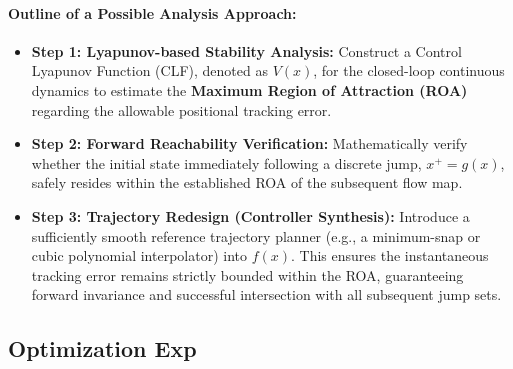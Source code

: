 \documentclass{article}
\begin{document}
\paragraph{Outline of a Possible Analysis Approach:} 
\begin{itemize}
  \item \textbf{Step 1: Lyapunov-based Stability Analysis:} Construct a Control Lyapunov Function (CLF), denoted as $V(x)$, for the closed-loop continuous dynamics to estimate the \textbf{Maximum Region of Attraction (ROA)} regarding the allowable positional tracking error.
  \item \textbf{Step 2: Forward Reachability Verification:} Mathematically verify whether the initial state immediately following a discrete jump, $x^+ = g(x)$, safely resides within the established ROA of the subsequent flow map.
  \item \textbf{Step 3: Trajectory Redesign (Controller Synthesis):} Introduce a sufficiently smooth reference trajectory planner (e.g., a minimum-snap or cubic polynomial interpolator) into $f(x)$. This ensures the instantaneous tracking error remains strictly bounded within the ROA, guaranteeing forward invariance and successful intersection with all subsequent jump sets.
\end{itemize}

\subsection{Optimization Exp}
\end{document}
